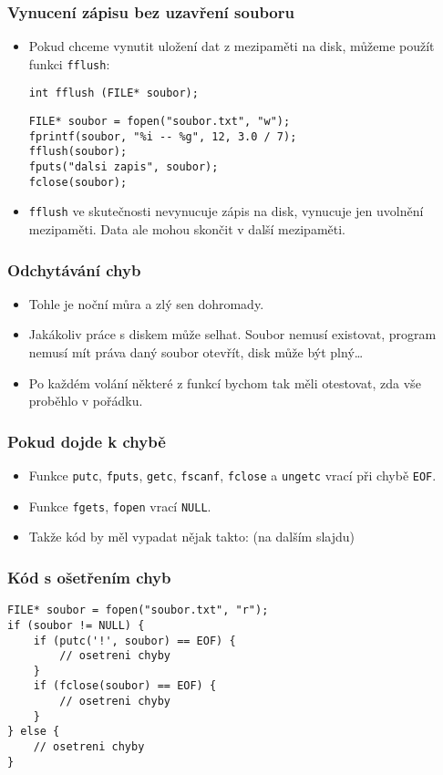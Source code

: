 \documentclass{beamer}
\newenvironment{itemizex}%
  {\large \begin{itemize}%
    \setlength{\itemsep}{8pt}%
    \setlength{\parskip}{8pt}}%
  {\end{itemize}}
\begin{document}
\begin{frame}[t,fragile]\frametitle{Vynucení zápisu bez uzavření souboru} 
    \begin{itemizex}
        \item Pokud chceme vynutit uložení dat z mezipaměti na disk, můžeme použít funkci \texttt{fflush}:
\begin{verbatim} 
int fflush (FILE* soubor);
\end{verbatim}

\begin{verbatim} 
FILE* soubor = fopen("soubor.txt", "w");
fprintf(soubor, "%i -- %g", 12, 3.0 / 7);
fflush(soubor);
fputs("dalsi zapis", soubor);
fclose(soubor);
\end{verbatim}
        \item \texttt{fflush} ve skutečnosti nevynucuje zápis na disk, vynucuje jen uvolnění mezipaměti. Data ale mohou skončit v další mezipaměti. 
    \end{itemizex}
\end{frame}


\begin{frame}[t,fragile]\frametitle{Odchytávání chyb} 
    \begin{itemizex}
        \item Tohle je noční můra a zlý sen dohromady. 
        \item Jakákoliv práce s diskem může selhat. Soubor nemusí existovat, program nemusí mít práva daný soubor otevřít, disk může být plný\dots
        \item Po každém volání některé z funkcí bychom tak měli otestovat, zda vše proběhlo v pořádku. 
    \end{itemizex}
\end{frame}


\begin{frame}[t,fragile]\frametitle{Pokud dojde k chybě} 
    \begin{itemizex}
        \item Funkce \texttt{putc}, \texttt{fputs}, \texttt{getc}, \texttt{fscanf}, \texttt{fclose} a \texttt{ungetc} vrací při chybě \texttt{EOF}.
        \item Funkce \texttt{fgets}, \texttt{fopen} vrací \texttt{NULL}.
        \item Takže kód by měl vypadat nějak takto: (na dalším slajdu)
    \end{itemizex}
\end{frame}


\begin{frame}[t,fragile]\frametitle{Kód s ošetřením chyb} 
\begin{verbatim} 
FILE* soubor = fopen("soubor.txt", "r");
if (soubor != NULL) {
    if (putc('!', soubor) == EOF) {
        // osetreni chyby
    }
    if (fclose(soubor) == EOF) {
        // osetreni chyby
    }
} else {
    // osetreni chyby
}
\end{verbatim}
\end{frame}
\end{document}
